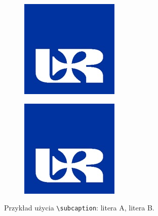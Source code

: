 \begin{figure}[H]
    \centering
    \begin{subfigure}{0.5\linewidth}
        \centering
        \includegraphics[width=.7\linewidth]{figures/ur.jpg}
        \subcaption{\label{subfigure_a}}
    \end{subfigure}%
    \begin{subfigure}{0.5\linewidth}
        \centering
        \includegraphics[width=.7\linewidth]{figures/ur.jpg}
        \subcaption{\label{subfigure_b}}
    \end{subfigure}
    \caption{Przykład użycia \texttt{\textbackslash subcaption}: \protect{} litera A, \protect{} litera B. \label{fig:subcaption_example}}
\end{figure}

